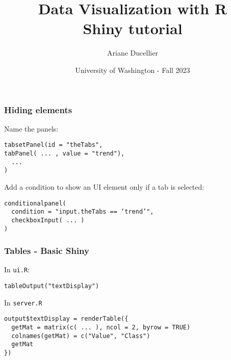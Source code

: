 \documentclass{beamer}
\title[Data Visualization with R - Shiny tutorial]{Data Visualization with R \\ Shiny tutorial}
\author{Ariane Ducellier}
\date{University of Washington - Fall 2023}
\begin{document}
	\begin{frame}
		\titlepage
	\end{frame}

	\begin{frame}[fragile]
		\frametitle{Hiding elements}
		
		Name the panels:
		\begin{exampleblock}{}
		\begin{BVerbatim}
tabsetPanel(id = "theTabs",
tabPanel( ... , value = "trend"),
  ...
)
		\end{BVerbatim}
		\end{exampleblock}{}

		\vspace{1em}

		Add a condition to show an UI element only if a tab is selected:
		\begin{exampleblock}{}
		\begin{BVerbatim}
conditionalpanel(
  condition = "input.theTabs == ‘trend’",
  checkboxInput( ... )
)
		\end{BVerbatim}
		\end{exampleblock}{}

	\end{frame}

	\begin{frame}[fragile]
		\frametitle{Tables - Basic Shiny}
		
		In \verb|ui.R|:
		\begin{exampleblock}{}
		\begin{BVerbatim}
tableOutput("textDisplay")
		\end{BVerbatim}
		\end{exampleblock}{}

		\vspace{1em}

		In \verb|server.R|
		\begin{exampleblock}{}
		\begin{BVerbatim}
output$textDisplay = renderTable({
  getMat = matrix(c( ... ), ncol = 2, byrow = TRUE)
  colnames(getMat) = c("Value", "Class")
  getMat
})
		\end{BVerbatim}
		\end{exampleblock}{}

	\end{frame}
\end{document}
